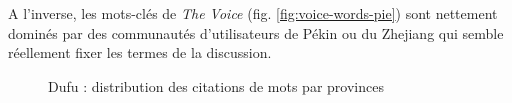 A l{\textquoteright}inverse, les mots-cl\'es de \textit{The Voice} (fig. \ref{fig:voice-words-pie}) sont
nettement domin\'es par des communaut\'es d{\textquoteright}utilisateurs de P\'ekin ou du Zhejiang qui semble r\'eellement fixer les termes de la discussion.

\begin{figure}
    \centering
    \newline
    
    \label{fig:biaoge-words-pie}
    \caption{
      Dufu : distribution des citations de mots par provinces 
    }
\end{figure}

